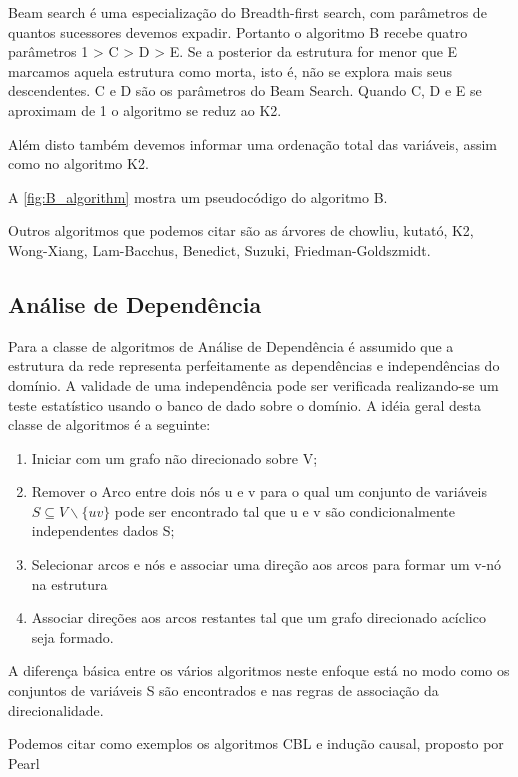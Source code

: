 Beam search é uma especialização do Breadth-first search, com parâmetros de quantos sucessores devemos expadir. Portanto o algoritmo B recebe quatro parâmetros 1 > C > D > E. Se a posterior da estrutura for menor que E marcamos aquela estrutura como morta, isto é, não se explora mais seus descendentes. C e D são os parâmetros do Beam Search. Quando C, D e E se aproximam de 1 o algoritmo se reduz ao K2.

Além disto também devemos informar uma ordenação total das variáveis, assim como no algoritmo K2.

A \autoref{fig:B_algorithm} mostra um pseudocódigo do algoritmo B.

Outros algoritmos que podemos citar são as árvores de chowliu\cite{chow68}, kutató\cite{kutato13}, K2, Wong-Xiang\cite{wong94}, Lam-Bacchus\cite{lam94}, Benedict\cite{benedict96}, Suzuki\cite{suzuki96}, Friedman-Goldszmidt\cite{friedman97}.
\subsection{Análise de Dependência}
Para a classe de algoritmos de Análise de Dependência é assumido que a estrutura da rede representa perfeitamente as dependências e independências do domínio. A validade de uma independência pode ser verificada realizando-se um teste estatístico usando o banco de dado sobre o domínio. A idéia geral desta classe de algoritmos é a seguinte:

\begin{enumerate}
	\item Iniciar com um grafo não direcionado sobre V;
	\item Remover o Arco entre dois nós u e v para o qual um conjunto de variáveis $S \subseteq V\backslash \{uv\} $ pode ser encontrado tal que u e v são condicionalmente independentes dados S;
	\item Selecionar arcos e nós e associar uma direção aos arcos para formar um v-nó na estrutura
	\item Associar direções aos arcos restantes tal que um grafo direcionado acíclico seja formado.
\end{enumerate}
A diferença básica entre os vários algoritmos neste enfoque está no modo como os conjuntos de variáveis S são encontrados e nas regras de associação da direcionalidade.

Podemos citar como exemplos os algoritmos CBL \cite{cbl98} e indução causal, proposto por Pearl \cite{pearl91}




